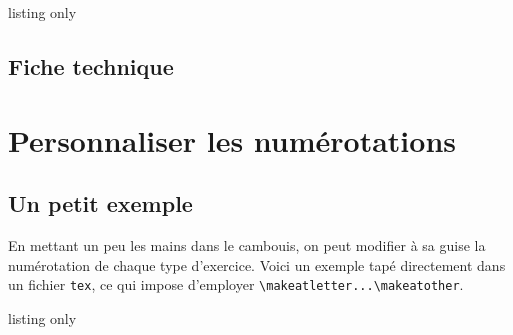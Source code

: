 \documentclass[12pt,a4paper]{scrartcl}
\begin{document}
\resetallcnt{}

\begin{tcblisting}{listing only}
\topic
\exercise
\exercise

\topic
\exercise
\end{tcblisting}

\examplestart{}
\topic
\exercise
\exercise

\topic
\exercise
\exampleend{}


    \subsection{Fiche technique}

\exosoptionsdescription{}

\bigskip





\exosoptions{}



\section{Personnaliser les numérotations}

    \subsection{Un petit exemple}

En mettant un peu les mains dans le cambouis, on peut modifier à sa guise la numérotation de chaque type d'exercice. Voici un exemple tapé directement dans un fichier \verb+tex+, ce qui impose d'employer \verb+\makeatletter...\makeatother+.

\resetallcnt{}

\begin{tcblisting}{listing only}
\makeatletter
    \renewcommand\lyxam@counter@exercise@style[1]{-- \arabic{#1} --}
\makeatother

\exercise
\exercise
\end{tcblisting}

\examplestart{}
\makeatletter
    \renewcommand\lyxam@counter@exercise@style[1]{-- \arabic{#1} --}
\makeatother

\exercise
\exercise
\exampleend{}
\end{document}
